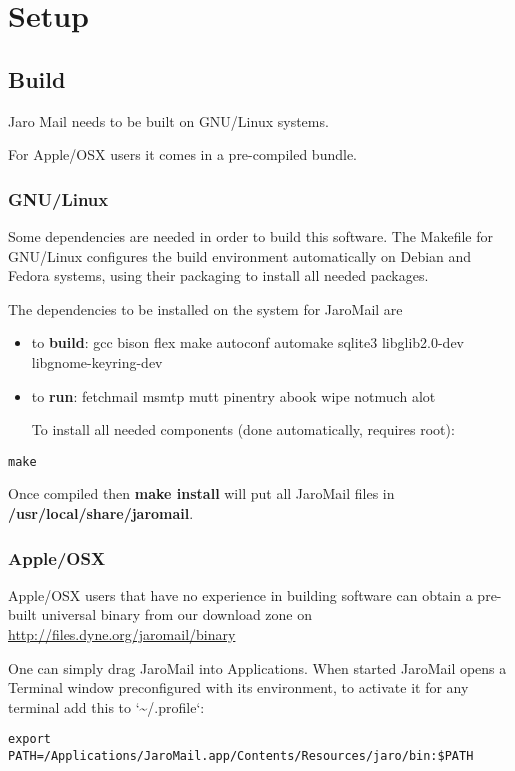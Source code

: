 \documentclass[a4,onecolumn,portrait]{article}
\begin{document}
\pagebreak
\section{Setup}
\label{sec-3}

\subsection{Build}
\label{sec-3-1}

Jaro Mail needs to be built on GNU/Linux systems.

For Apple/OSX users it comes in a pre-compiled bundle.

\subsubsection{GNU/Linux}
\label{sec-3-1-1}

Some dependencies are needed in order to build this software. The Makefile for GNU/Linux configures the build environment automatically on Debian and Fedora systems, using their packaging to install all needed packages.

The dependencies to be installed on the system for JaroMail are
\begin{itemize}
\item to \textbf{build}: gcc bison flex make autoconf automake sqlite3  libglib2.0-dev libgnome-keyring-dev
\item to \textbf{run}: fetchmail msmtp mutt pinentry abook wipe notmuch alot

To install all needed components (done automatically, requires root):
\end{itemize}

\begin{verbatim}
make
\end{verbatim}

Once compiled then \textbf{make install} will put all JaroMail files in \textbf{/usr/local/share/jaromail}.
\subsubsection{Apple/OSX}
\label{sec-3-1-2}

Apple/OSX users that have no experience in building software can obtain a pre-built universal binary from our download zone on \url{http://files.dyne.org/jaromail/binary}

One can simply drag JaroMail into Applications. When started JaroMail opens a Terminal window preconfigured with its environment, to activate it for any terminal add this to `\textasciitilde{}/.profile`:
\begin{verbatim}
export PATH=/Applications/JaroMail.app/Contents/Resources/jaro/bin:$PATH
\end{verbatim}
\end{document}
